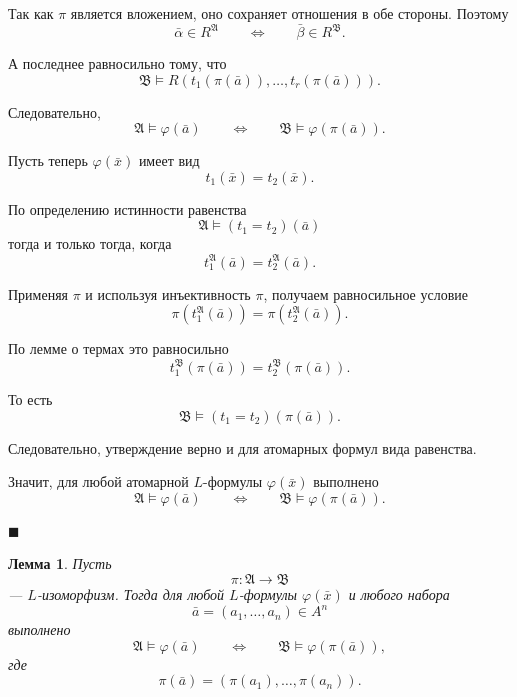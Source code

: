 \documentclass[12pt,a4paper,oneside,openany]{book}
\theoremstyle{definition}
\theoremstyle{plain}
\newtheorem{lemma}{Лемма}[chapter]
\theoremstyle{remark}
\begin{document}
Так как $\pi$ является вложением, оно сохраняет отношения в обе стороны. Поэтому
\[
\bar \alpha\in R^{\mathfrak A}
\qquad
\Longleftrightarrow
\qquad
\bar \beta\in R^{\mathfrak B}.
\]

А последнее равносильно тому, что
\[
\mathfrak B\models R(t_1(\pi(\bar a)),\ldots,t_r(\pi(\bar a))).
\]

Следовательно,
\[
\mathfrak A\models \varphi(\bar a)
\qquad
\Longleftrightarrow
\qquad
\mathfrak B\models \varphi(\pi(\bar a)).
\]

Пусть теперь $\varphi(\bar x)$ имеет вид
\[
t_1(\bar x)=t_2(\bar x).
\]

По определению истинности равенства
\[
\mathfrak A\models (t_1=t_2)(\bar a)
\]
тогда и только тогда, когда
\[
t_1^{\mathfrak A}(\bar a)=t_2^{\mathfrak A}(\bar a).
\]

Применяя $\pi$ и используя инъективность $\pi$, получаем равносильное условие
\[
\pi(t_1^{\mathfrak A}(\bar a))
=
\pi(t_2^{\mathfrak A}(\bar a)).
\]

По лемме о термах это равносильно
\[
t_1^{\mathfrak B}(\pi(\bar a))
=
t_2^{\mathfrak B}(\pi(\bar a)).
\]

То есть
\[
\mathfrak B\models (t_1=t_2)(\pi(\bar a)).
\]

Следовательно, утверждение верно и для атомарных формул вида равенства.

Значит, для любой атомарной $L$-формулы $\varphi(\bar x)$ выполнено
\[
\mathfrak A\models \varphi(\bar a)
\qquad
\Longleftrightarrow
\qquad
\mathfrak B\models \varphi(\pi(\bar a)).
\]

$\blacksquare$

\begin{lemma}
Пусть
\[
\pi:\mathfrak A\to\mathfrak B
\]
— $L$-изоморфизм. Тогда для любой $L$-формулы $\varphi(\bar x)$ и любого набора
\[
\bar a=(a_1,\ldots,a_n)\in A^n
\]
выполнено
\[
\mathfrak A\models \varphi(\bar a)
\qquad
\Longleftrightarrow
\qquad
\mathfrak B\models \varphi(\pi(\bar a)),
\]
где
\[
\pi(\bar a)=(\pi(a_1),\ldots,\pi(a_n)).
\]
\end{lemma}
\end{document}
